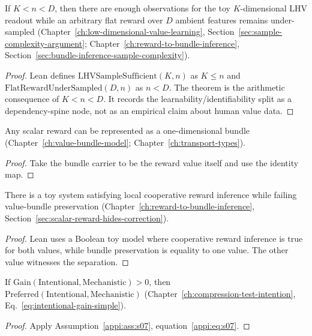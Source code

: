 \begin{theorem}
\label{appi:thm:p16}
If \(K<n<D\), then there are enough observations for the toy \(K\)-dimensional LHV readout while an arbitrary flat reward over \(D\) ambient features remains under-sampled (Chapter~\ref{ch:low-dimensional-value-learning}, Section~\ref{sec:sample-complexity-argument}; Chapter~\ref{ch:reward-to-bundle-inference}, Section~\ref{sec:bundle-inference-sample-complexity}).
\end{theorem}
\begin{proof}
Lean defines \(\mathrm{LHVSampleSufficient}(K,n)\) as \(K\leq n\) and \(\mathrm{FlatRewardUnderSampled}(D,n)\) as \(n<D\).
The theorem is the arithmetic consequence of \(K<n<D\).
It records the learnability/identifiability split as a dependency-spine node, not as an empirical claim about human value data.
\end{proof}

\begin{lemma}
\label{appi:lem:p19}
Any scalar reward can be represented as a one-dimensional bundle (Chapter~\ref{ch:value-bundle-model}; Chapter~\ref{ch:transport-types}).
\end{lemma}
\begin{proof}
Take the bundle carrier to be the reward value itself and use the identity map.
\end{proof}

\begin{theorem}
\label{appi:thm:cooperative-reward-not-bundle}
There is a toy system satisfying local cooperative reward inference while failing value-bundle preservation (Chapter~\ref{ch:reward-to-bundle-inference}, Section~\ref{sec:scalar-reward-hides-correction}).
\end{theorem}
\begin{proof}
Lean uses a Boolean toy model where cooperative reward inference is true for both values, while bundle preservation is equality to one value. The other value witnesses the separation.
\end{proof}

\begin{theorem}
\label{appi:thm:p20}
If \(\mathrm{Gain}(\mathrm{Intentional},\mathrm{Mechanistic})>0\), then \(\mathrm{Preferred}(\mathrm{Intentional},\mathrm{Mechanistic})\) (Chapter~\ref{ch:compression-test-intention}, Eq.~\eqref{eq:intentional-gain-simple}).
\end{theorem}
\begin{proof}
Apply Assumption~\ref{appi:ass:s07}, equation~\eqref{appi:eq:s07}.
\end{proof}

